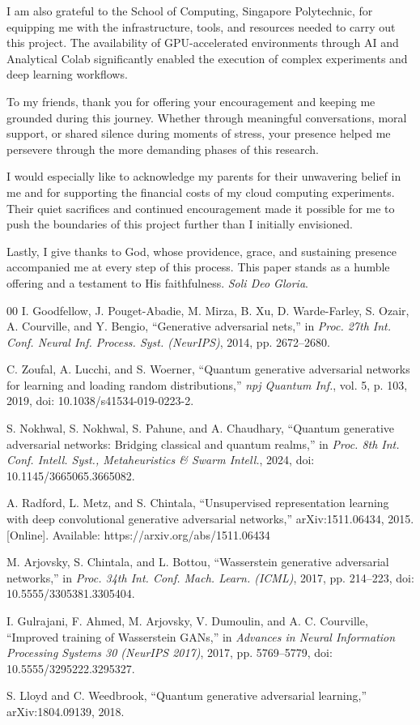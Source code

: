 \documentclass[conference]{IEEEtran}
\begin{document}
I am also grateful to the School of Computing, Singapore Polytechnic, for equipping me with the infrastructure, tools, and resources needed to carry out this project. The availability of GPU-accelerated environments through AI and Analytical Colab significantly enabled the execution of complex experiments and deep learning workflows.

To my friends, thank you for offering your encouragement and keeping me grounded during this journey. Whether through meaningful conversations, moral support, or shared silence during moments of stress, your presence helped me persevere through the more demanding phases of this research.

I would especially like to acknowledge my parents for their unwavering belief in me and for supporting the financial costs of my cloud computing experiments. Their quiet sacrifices and continued encouragement made it possible for me to push the boundaries of this project further than I initially envisioned.

Lastly, I give thanks to God, whose providence, grace, and sustaining presence accompanied me at every step of this process. This paper stands as a humble offering and a testament to His faithfulness. \textit{Soli Deo Gloria}.

\begin{thebibliography}{00}
 I. Goodfellow, J. Pouget-Abadie, M. Mirza, B. Xu, D. Warde-Farley, S. Ozair, A. Courville, and Y. Bengio, ``Generative adversarial nets,'' in \textit{Proc. 27th Int. Conf. Neural Inf. Process. Syst. (NeurIPS)}, 2014, pp. 2672--2680.

 C. Zoufal, A. Lucchi, and S. Woerner, ``Quantum generative adversarial networks for learning and loading random distributions,'' \textit{npj Quantum Inf.}, vol. 5, p. 103, 2019, doi: 10.1038/s41534-019-0223-2.

 S. Nokhwal, S. Nokhwal, S. Pahune, and A. Chaudhary, ``Quantum generative adversarial networks: Bridging classical and quantum realms,'' in \textit{Proc. 8th Int. Conf. Intell. Syst., Metaheuristics \& Swarm Intell.}, 2024, doi: 10.1145/3665065.3665082.

 A. Radford, L. Metz, and S. Chintala, ``Unsupervised representation learning with deep convolutional generative adversarial networks,'' arXiv:1511.06434, 2015. [Online]. Available: https://arxiv.org/abs/1511.06434

 M. Arjovsky, S. Chintala, and L. Bottou, ``Wasserstein generative adversarial networks,'' in \textit{Proc. 34th Int. Conf. Mach. Learn. (ICML)}, 2017, pp. 214--223, doi: 10.5555/3305381.3305404.

 I. Gulrajani, F. Ahmed, M. Arjovsky, V. Dumoulin, and A. C. Courville, ``Improved training of Wasserstein GANs,'' in \textit{Advances in Neural Information Processing Systems 30 (NeurIPS 2017)}, 2017, pp. 5769--5779, doi: 10.5555/3295222.3295327.

 S. Lloyd and C. Weedbrook, ``Quantum generative adversarial learning,'' arXiv:1804.09139, 2018.

\end{thebibliography}
\end{document}
